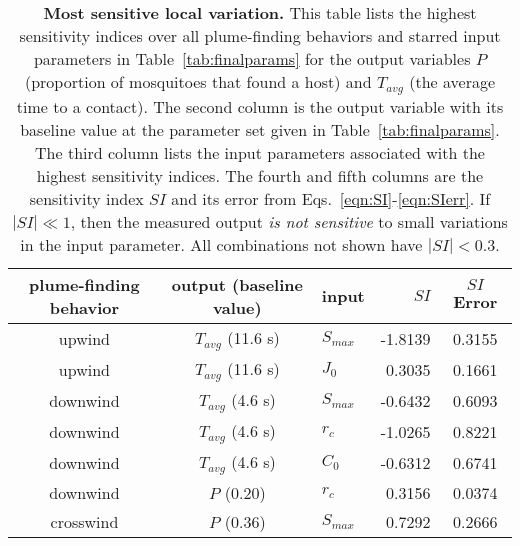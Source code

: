\documentclass[10pt]{article}
\begin{document}
\begin{table}[!htp]
\caption{
{\bf Most sensitive local variation.} This table lists the highest sensitivity indices over all plume-finding behaviors and starred input parameters in Table~\ref{tab:finalparams} for the output variables $P$ (proportion of mosquitoes that found a host) and $T_{avg}$ (the average time to a contact). The second column is the output variable with its baseline value at the parameter set given in Table~\ref{tab:finalparams}. The third column lists the input parameters associated with the highest sensitivity indices. The fourth and fifth columns are the sensitivity index $SI$ and its error from Eqs.~\eqref{eqn:SI}-\eqref{eqn:SIerr}. If $|SI| \ll 1$, then the measured output \textit{is not sensitive} to small variations in the input parameter. All combinations not shown have $|SI| < 0.3$. }
	\begin{center}
		\begin{tabular}{|cclrc|}
			\hline
			plume-finding behavior & output (baseline value) & input & $SI$ \hspace{5pt} & $SI$ Error \\
			\hline
			upwind & $T_{avg}$ (11.6 s) & $S_{max}$  &  -1.8139 & 0.3155 \\
			upwind	& 	$T_{avg}$ (11.6 s)	  & 	$J_0$&    0.3035 & 0.1661 \\
			downwind & $T_{avg}$ (4.6 s) & $S_{max}$  & -0.6432 & 0.6093\\
			downwind & $T_{avg}$ (4.6 s)		& $r_c$		&  -1.0265 & 0.8221\\						
			downwind & $T_{avg}$ (4.6 s)  & 	$C_0$		&   -0.6312 & 0.6741\\
			downwind	& $P$ (0.20)	& $r_c$  & 0.3156 & 0.0374\\
			crosswind & $P$ (0.36)	& $S_{max}$ & 0.7292  & 0.2666\\
			\hline
		\end{tabular}
	\end{center}\label{tab:sensitivity}
\end{table}
\end{document}
